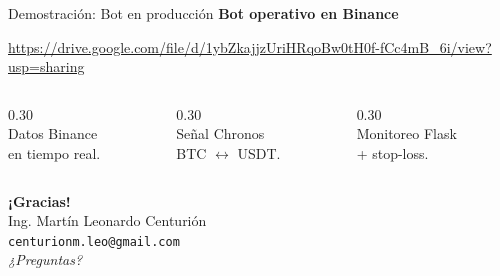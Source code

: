 \documentclass[aspectratio=169, spanish, 12pt]{beamer}
\begin{document}
\begin{frame}{Demostración: Bot en producción}
  \centering
  \vspace{0.3em}
  {\large\faRobot\;\textbf{Bot operativo en Binance}}\\[0.9em]
  \begin{tcolorbox}[familybox=coltrans, top=8pt, bottom=8pt,
                    left=16pt, right=16pt, halign=center]
    \href{https://drive.google.com/file/d/1ybZkajjzUriHRqoBw0tH0f-fCc4mB_6i/view?usp=sharing}{%
      \small\ttfamily https://drive.google.com/file/d/1ybZkajjzUriHRqoBw0tH0f-fCc4mB\_6i/view?usp=sharing}
  \end{tcolorbox}
  \vspace{0.7em}
  \begin{columns}[T]
    \begin{column}{0.30\textwidth}
      \centering{\Large\textcolor{fiubablue}{\faDatabase}}\\[0.3em]
      \small Datos Binance\\en tiempo real.
    \end{column}
    \begin{column}{0.30\textwidth}
      \centering{\Large\textcolor{coltrans}{\faChartLine}}\\[0.3em]
      \small Señal Chronos\\BTC \(\leftrightarrow\) USDT.
    \end{column}
    \begin{column}{0.30\textwidth}
      \centering{\Large\textcolor{accent}{\faBell}}\\[0.3em]
      \small Monitoreo Flask\\+ stop-loss.
    \end{column}
  \end{columns}
\end{frame}

\begin{frame}[plain]
  \centering\vspace{2em}
  \Large\textbf{¡Gracias!}\\[1.5em]
  \normalsize
  Ing. Martín Leonardo Centurión\\[0.5em]
  \texttt{centurionm.leo@gmail.com}\\[2em]
  \large\textit{¿Preguntas?}
\end{frame}

\appendix
\end{document}
